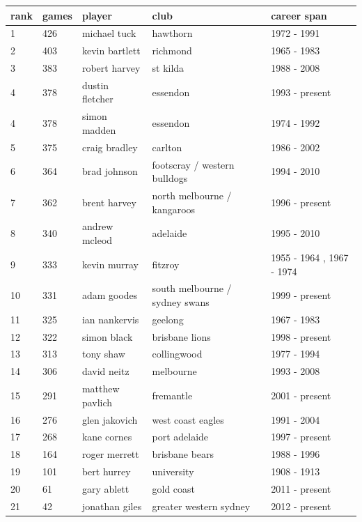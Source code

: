 \documentclass{article}
\begin{document}
\begin{tabular}{lllll}
\toprule
rank & games & player & club & career span \\
\midrule
1 & 426 & michael tuck & hawthorn & 1972 - 1991 \\
2 & 403 & kevin bartlett & richmond & 1965 - 1983 \\
3 & 383 & robert harvey & st kilda & 1988 - 2008 \\
4 & 378 & dustin fletcher & essendon & 1993 - present \\
4 & 378 & simon madden & essendon & 1974 - 1992 \\
5 & 375 & craig bradley & carlton & 1986 - 2002 \\
6 & 364 & brad johnson & footscray / western bulldogs & 1994 - 2010 \\
7 & 362 & brent harvey & north melbourne / kangaroos & 1996 - present \\
8 & 340 & andrew mcleod & adelaide & 1995 - 2010 \\
9 & 333 & kevin murray & fitzroy & 1955 - 1964 , 1967 - 1974 \\
10 & 331 & adam goodes & south melbourne / sydney swans & 1999 - present \\
11 & 325 & ian nankervis & geelong & 1967 - 1983 \\
12 & 322 & simon black & brisbane lions & 1998 - present \\
13 & 313 & tony shaw & collingwood & 1977 - 1994 \\
14 & 306 & david neitz & melbourne & 1993 - 2008 \\
15 & 291 & matthew pavlich & fremantle & 2001 - present \\
16 & 276 & glen jakovich & west coast eagles & 1991 - 2004 \\
17 & 268 & kane cornes & port adelaide & 1997 - present \\
18 & 164 & roger merrett & brisbane bears & 1988 - 1996 \\
19 & 101 & bert hurrey & university & 1908 - 1913 \\
20 & 61 & gary ablett & gold coast & 2011 - present \\
21 & 42 & jonathan giles & greater western sydney & 2012 - present \\
\bottomrule
\end{tabular}
\end{document}
